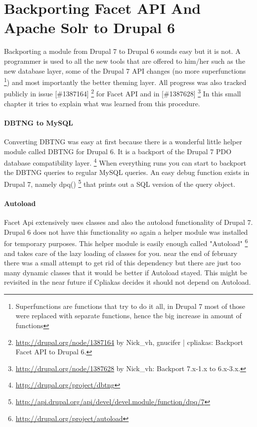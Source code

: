 \section{Backporting Facet API And Apache Solr to Drupal 6}
Backporting a module from Drupal 7 to Drupal 6 sounds easy but it is not. A programmer is used to all the new tools that are offered to him/her such as the new database layer, some of the Drupal 7 API changes (no more superfunctions \footnote{Superfunctions are functions that try to do it all, in Drupal 7 most of those were replaced with separate functions, hence the big increase in amount of functions}) and most importantly the better theming layer. All progress was also tracked publicly in issue [\#1387164] \footnote{\url{http://drupal.org/node/1387164} by Nick\_vh, gnucifer | cpliakas: Backport Facet API to Drupal 6.} for Facet API and in [\#1387628] \footnote{\url{http://drupal.org/node/1387628} by Nick\_vh: Backport 7.x-1.x to 6.x-3.x.} In this small chapter it tries to explain what was learned from this procedure.

\paragraph{DBTNG to MySQL}
Converting DBTNG was easy at first because there is a wonderful little helper module called DBTNG for Drupal 6. It is a backport of the Drupal 7 PDO database compatibility layer. \footnote{\url{http://drupal.org/project/dbtng}} When everything runs you can start to backport the DBTNG queries to regular MySQL queries. An easy debug function exists in Drupal 7, namely dpq() \footnote{\url{http://api.drupal.org/api/devel/devel.module/function/dpq/7}} that prints out a SQL version of the query object.

\paragraph{Autoload}
Facet Api extensively uses classes and also the autoload functionality of Drupal 7. Drupal 6 does not have this functionality so again a helper module was installed for temporary purposes. This helper module is easily enough called "Autoload" \footnote{\url{http://drupal.org/project/autoload}} and takes care of the lazy loading of classes for you. near the end of february there was a small attempt to get rid of this dependency but there are just too many dynamic classes that it would be better if Autoload stayed. This might be revisited in the near future if Cpliakas decides it should not depend on Autoload.

